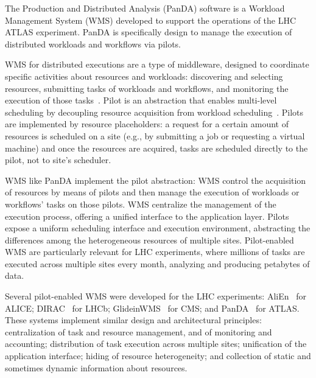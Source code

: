 

The Production and Distributed Analysis (PanDA) software is a Workload
Management System (WMS) developed to support the operations of the LHC ATLAS
experiment. PanDA is specifically design to manage the execution of distributed
workloads and workflows via pilots.

WMS for distributed executions are a type of middleware, designed to coordinate
specific activities about resources and workloads: discovering and selecting
resources, submitting tasks of workloads and workflows, and monitoring the
execution of those tasks~\cite{marco2009glite}. Pilot is an abstraction that
enables multi-level scheduling by decoupling resource acquisition from workload
scheduling~\cite{turilli2015comprehensive}. Pilots are implemented by resource
placeholders: a request for a certain amount of resources is scheduled on a site
(e.g., by submitting a job or requesting a virtual machine) and once the
resources are acquired, tasks are scheduled directly to the pilot, not to site's
scheduler.

WMS like PanDA implement the pilot abstraction: WMS control the acquisition of
resources by means of pilots and then manage the execution of workloads or
workflows' tasks on those pilots. WMS centralize the management of the execution
process, offering a unified interface to the application layer. Pilots expose a
uniform scheduling interface and execution environment, abstracting the
differences among the heterogeneous resources of multiple sites. Pilot-enabled
WMS are particularly relevant for LHC experiments, where millions of tasks are
executed across multiple sites every month, analyzing and producing petabytes of
data.

Several pilot-enabled WMS were developed for the LHC experiments:
AliEn~\cite{Bagnasco2010} for ALICE; DIRAC~\cite{Paterson2010} for LHCb;
GlideinWMS~\cite{sfiligoi2008glideinwms} for CMS; and
PanDA~\cite{maeno2014evolution} for ATLAS. These systems implement similar
design and architectural principles: centralization of task and resource
management, and of monitoring and accounting; distribution of task execution
across multiple sites; unification of the application interface; hiding of
resource heterogeneity; and collection of static and sometimes dynamic
information about resources.

